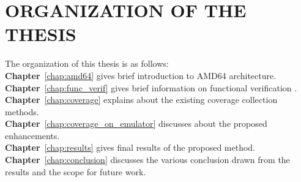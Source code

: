\section{ORGANIZATION OF THE THESIS}
The organization of this thesis is as follows:\\
\noindent
    {\bf Chapter}~\ref{chap:amd64} gives brief introduction to AMD64 architecture.\\
    {\bf Chapter}~\ref{chap:func_verif} gives brief information on functional verification .\\
    {\bf Chapter}~\ref{chap:coverage} explains about the existing coverage collection methods.\\
    {\bf Chapter}~\ref{chap:coverage_on_emulator} discusses about the proposed enhancements.\\
    {\bf Chapter}~\ref{chap:results} gives final results of the proposed method.\\
    {\bf Chapter}~\ref{chap:conclusion} discusses the various conclusion drawn from the results and the scope for future work.
